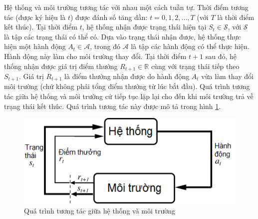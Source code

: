 Hệ thống và môi trường tương tác với nhau một cách tuần tự.
Thời điểm tương tác (được ký hiệu là $t$) được đánh số tăng dần: $t = 0, 1, 2,..., T$ (với $T$ là thời điểm kết thúc).
Tại thời điểm $t$, hệ thống nhận được trạng thái hiện tại $\mathit{S_t} \in \mathcal{S}$, với $\mathcal{S}$ là tập các trạng thái có thể có. 
Dựa vào trạng thái nhận được, hệ thống thực hiện một hành động $\mathit{A_t} \in \mathcal{A}$, trong đó $\mathcal{A}$ là tập các hành động có thể thực hiện. 
Hành động này làm cho môi trường thay đổi.
Tại thời điểm $t+1$ sau đó, hệ thống nhận được giá trị điểm thưởng $\mathit{R_{t+1}} \in \mathbb{R}$ cùng với trạng thái tiếp theo $\mathit{S_{t+1}}$.
Giá trị $R_{t+1}$ là điểm thưởng nhận được do hành động $\mathit{A_t}$ vừa làm thay đổi môi trường (chứ không phải tổng điểm thưởng từ lúc bắt đầu).
Quá trình tương tác giữa hệ thống và môi trường cứ tiếp tục lặp lại cho đến khi môi trường trả về trạng thái kết thúc.
Quá trình tương tác này được mô tả trong hình \ref{AgentEnvironment}.

\begin{figure}
	\centering
	\includegraphics[width=.8\textwidth]{AgentEnvironment}
	\caption{Quá trình tương tác giữa hệ thống và môi trường}
	\label{AgentEnvironment}
\end{figure}

